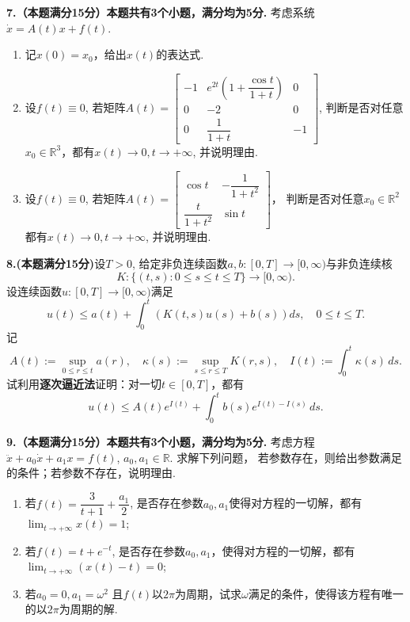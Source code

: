 \textbf{7.（本题满分15分）本题共有3个小题，满分均为5分.} 考虑系统$\dot{x}=A(t)x+f(t)$. 
\begin{enumerate}
    \item[(1)] 记$x(0)=x_0$，给出$x(t)$的表达式.
    \item[(2)] 设$f(t)\equiv 0$, 若矩阵$A(t)=\begin{bmatrix}-1 & e^{2t}\left( 1+ \dfrac{\cos t}{1+t}\right) & 0 \\
        0 & -2 & 0 \\ 0 & \dfrac{1}{1+t} & -1 
    \end{bmatrix}$, 判断是否对任意$x_0\in \mathbb{R}^3$，都有$x(t)\to 0, t\to +\infty$, 并说明理由.
    \item[(3)] 设$f(t)\equiv 0$, 若矩阵$A(t)=\begin{bmatrix}\cos t & -\dfrac{1}{1+t^2}\\ \dfrac{t}{1+t^2} & \sin t\end{bmatrix}$，
    判断是否对任意$x_0\in \mathbb{R}^2$都有$x(t)\to 0, t\to +\infty$, 并说明理由. 
\end{enumerate}

\textbf{8.(本题满分15分)}设$T>0$, 给定非负连续函数$a,b:[0,T]\to [0,\infty)$与非负连续核
\[
    K:\{ (t,s) : 0\le s \le t\le T\}\to [0, \infty).
\]
设连续函数$u:[0,T]\to [0,\infty)$满足
\begin{equation*}
    u(t)\le a(t)+\int_{0}^t\left( K(t,s)u(s)+b(s)\right) ds,\quad 0\le t\le T.
\end{equation*}
记
\[
    A(t):= \sup_{0\le r\le t}a(r), \quad \kappa(s):=\sup_{s\le r\le T}K(r,s),\quad I(t):= \int _0^t \kappa(s)\,ds.
\]
试利用\textbf{逐次逼近法}证明：对一切$t\in[0,T]$，都有
\[
    u(t)\le A(t)e^{I(t)}+\int_0^t b(s)e^{I(t)-I(s)}\,ds.
\]

\textbf{9.（本题满分15分）本题共有3个小题，满分均为5分.} 考虑方程$\ddot{x}+a_0\dot{x}+a_1 x=f(t)$, $a_0, a_1\in \mathbb{R}$. 求解下列问题，
若参数存在，则给出参数满足的条件；若参数不存在，说明理由.
\begin{enumerate}
    \item[(1)] 若$f(t)=\dfrac{3}{t+1}+\dfrac{a_1}{2}$, 是否存在参数$a_0, a_1$使得对方程的一切解，都有$\displaystyle \lim _{t\to +\infty}x(t)=1$;
    \item[(2)] 若$f(t)=t+e^{-t}$, 是否存在参数$a_0,a_1$，使得对方程的一切解，都有$\displaystyle \lim_{t\to +\infty}(x(t)-t)=0$;
    \item[(3)] 若$a_0=0, a_1=\omega^2$ 且$f(t)$以$2\pi$为周期，试求$\omega$满足的条件，使得该方程有唯一的以$2\pi$为周期的解.
\end{enumerate}

